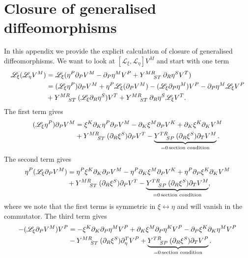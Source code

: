 \section{Closure of generalised diffeomorphisms\label{app:GenDiffComm}}
In this appendix we provide the explicit calculation of closure of generalised diffeomorphisms. We want to look at $[\mathscr{L}_\xi,\mathscr{L}_\eta] V^M$ and start with one term 
\begin{equation}
    \begin{aligned}
        \mathscr{L}_{\xi}(\mathscr{L}_\eta V^M) &= \mathscr{L}_\xi(\eta^P\pd_PV^M-\pd_P\eta^MV^P+\tensor{Y}{^{MR}_{ST}}\pd_R\eta^S V^T)\\
        &= (\mathscr{L}_\xi \eta^P)\pd_PV^M+\eta^P\mathscr{L}_\xi(\pd_PV^M)-(\mathscr{L}_\xi\pd_P\eta^M)V^P-\pd_P\eta^M\mathscr{L}_\xi V^P\\
        &+\tensor{Y}{^{MR}_{ST}}(\mathscr{L}_\xi\pd_R\eta^S)V^T+\tensor{Y}{^{MR}_{ST}}\pd_R\eta^S\mathscr{L}_\xi V^T.
    \end{aligned}
\end{equation}
The first term gives 
\begin{equation}
    \begin{aligned}
        (\mathscr{L}_\xi\eta^P)\pd_PV^M &= \xi^K\pd_K\eta^P\pd_PV^M-\pd_K\xi^M\pd_PV^K+\pd_K\xi^K\pd_KV^M\\
        &+\tensor{Y}{^{MR}_{ST}}(\pd_R\xi^S)\pd_PV^T-\underbrace{\tensor{Y}{^{TR}_{SP}}(\pd_R\xi^S)\pd_TV^M}_{=0\,\text{section condition}}.
    \end{aligned}
\end{equation}
The second term gives 
\begin{equation}
    \begin{aligned}
        \eta^P(\mathscr{L}_\xi\pd_PV^M) &= \eta^P\xi^K\pd_K\pd_PV^M-\eta^P\pd_K\xi^M\pd_PV^K+\eta^P\pd_P\xi^K\pd_KV^M\\
        &+ \tensor{Y}{^{MR}_{ST}}(\pd_R\xi^S)\pd_PV^T-\underbrace{\tensor{Y}{^{TR}_{SP}}(\pd_R\xi^S)\pd_TV^M}_{=0\, \text{section condition}},
    \end{aligned}
\end{equation}
where we note that the first terms is symmetric in $\xi\leftrightarrow\eta$ and will vanish in the commutator. The third term gives 
\begin{equation}
    \begin{aligned}
        -(\mathscr{L}_\xi\pd_PV^M)V^P&=-\xi^K\pd_K\pd_P\eta^MV^P+\pd_K\xi^M\pd_P\eta^KV^P-\pd_P\xi^K\pd_K\eta^MV^P\\
        &-\tensor{Y}{^{MR}_{ST}}(\pd_R\xi^S)\pd_\eta^TV^P+\underbrace{\tensor{Y}{^{TR}_{SP}}(\pd_R\xi^S)\pd_TV^P}_{=0\, \text{section condition}}.
    \end{aligned}
\end{equation}
